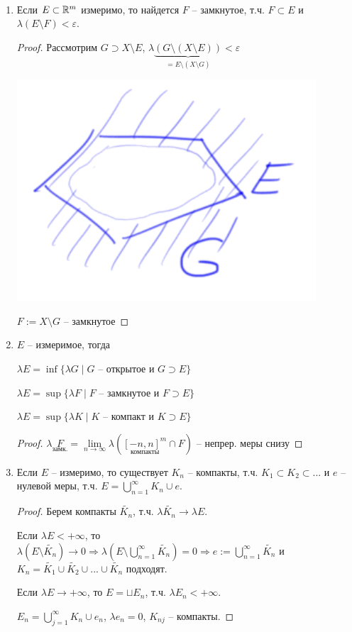 \begin{corollary}~
    \begin{enumerate}
        \item Если $E\subset \mathbb{R}^m$ измеримо, то найдется $F$ – замкнутое, т.ч. 
        $F\subset E$ и $\lambda (E\setminus F)< \varepsilon$.

        \begin{proof}
            Рассмотрим $G\supset X\setminus E$, $\lambda \underbrace{(G\setminus (X\setminus E))}_{=E\setminus (X\setminus G)}< \varepsilon$

            \includegraphics[width=0.2\linewidth]{images/23-09-21-5.png}

            $F:= X\setminus G$ – замкнутое
        \end{proof}

        \item $E$ – измеримое, тогда 
        
        $\lambda E =\inf \{\lambda G\mid G\text{ – открытое и } G\supset E\}$

        $\lambda E = \sup \{\lambda F\mid F\text{ – замкнутое и } F\supset E\}$

        $\lambda E = \sup \{\lambda K\mid K\text{ – компакт и } K\supset E\}$

        \begin{proof}
            $\lambda \underset{\text{замк.}}{F}=\lim\limits_{n\rightarrow \infty} \lambda (\underset{\text{компакты}}{[-n, n]^m} \cap F)$ – непрер. меры снизу
        \end{proof}
        
        \item Если $E$ – измеримо, то существует $K_n$ – компакты, т.ч. $K_1 \subset K_2 \subset ...$ и $e$ – нулевой
        меры, т.ч. $E=\bigcup\limits_{n=1}^\infty K_n\cup e$.

        \begin{proof}
            Берем компакты $\tilde{K_n}$, т.ч. $\lambda\tilde{K_n} \rightarrow \lambda E$.

            Если $\lambda E<+\infty $, то $\lambda (E\setminus \tilde{K_n})\rightarrow 0\Rightarrow \lambda (E\setminus \bigcup\limits_{n=1}^\infty \tilde{K_n}) = 0
            \Rightarrow e:=\bigcup\limits_{n=1}^\infty \tilde{K_n}$ и $K_n=\tilde{K_1}\cup \tilde{K_2}\cup ... \cup \tilde{K_n}$ подходят.

            Если $\lambda E\rightarrow +\infty $, то $E=\sqcup E_n$, т.ч. $\lambda E_n < +\infty$.

            $E_n=\bigcup\limits_{j=1}^\infty K_n\cup e_n$, $\lambda e_n = 0$, $K_{nj}$ – компакты.
        \end{proof}
    \end{enumerate}
\end{corollary}

